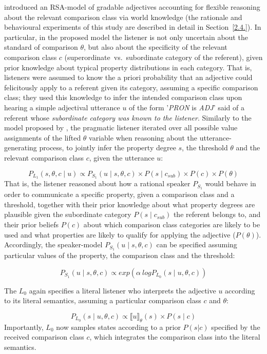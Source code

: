 \textcite{tessler2017warm} introduced an RSA-model of gradable adjectives accounting for flexible reasoning about the relevant comparison class via world knowledge (the rationale and behavioural experiments of this study are described in detail in Section~\ref{2.4.}). In particular, in the proposed model the listener is not only uncertain about the standard of comparison $\theta$, but also about the specificity of the relevant comparison class $c$ (superordinate~vs.~subordinate category of the referent), given prior knowledge about typical property distributions in each category. That is, listeners were assumed to know the a priori probability that an adjective could felicitously apply to a referent given its category, assuming a specific comparison class; they used this knowledge to infer the intended comparison class upon hearing a simple adjectival utterance $u$ of the form '\emph{PRON} is \emph{ADJ}' said of a referent whose \emph{subordinate category was known to the listener}.
Similarly to the model proposed by \textcite{lassiter2013context}, the pragmatic listener iterated over all possible value assignments of the lifted $\theta$ variable when reasoning about the utterance-generating process, to jointly infer the property degree $s$, the threshold $\theta$ and the relevant comparison class $c$, given the utterance $u$:

$$P_{L_1}(s, \theta, c \mid u) \propto P_{S_1} ( u \mid s, \theta, c) \times P(s \mid c_{sub}) \times P(c) \times P(\theta)$$  
That is, the listener reasoned about how a rational speaker $P_{S_1}$ would behave in order to communicate a specific property, given a comparison class and a threshold, together with their prior knowledge about what property degrees are plausible given the subordinate category $P(s \mid c _{sub})$ the referent belongs to, and their prior beliefs $P(c)$ about which comparison class categories are likely to be used and what properties are likely to qualify for applying the adjective ($P(\theta)$). Accordingly, the speaker-model $P_{S_1}( u \mid s, \theta, c)$ can be specified assuming particular values of the property, the comparison class and the threshold:

$$P_{S_1}( u \mid s, \theta, c) \propto exp(\alpha \: log P_{L_0} (s \mid u, \theta, c))$$

The $L_0$ again specifies a literal listener who interprets the adjective $u$ according to its literal semantics, assuming a particular comparison class $c$ and $\theta$:

$$P_{L_0}(s \mid u, \theta, c) \propto \llbracket u \rrbracket_{\theta} (s) \times P( s \mid c)$$  
Importantly, $L_0$ now samples states according to a prior $P(s|c)$ specified by the received comparison class $c$, which integrates the comparison class into the literal semantics. 

